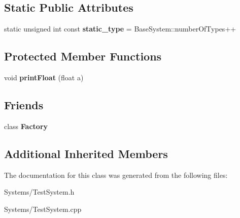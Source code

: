 \subsection*{Static Public Attributes}
\begin{DoxyCompactItemize}
\item 
\mbox{\label{classTestSystem_a2557cacb59b1a2192396bf39bf191df5}} 
static unsigned int const {\bfseries static\+\_\+type} = Base\+System\+::number\+Of\+Types++
\end{DoxyCompactItemize}
\subsection*{Protected Member Functions}
\begin{DoxyCompactItemize}
\item 
\mbox{\label{classTestSystem_a7e9753ae789d2e9a57e428b1c34a7075}} 
void {\bfseries print\+Float} (float a)
\end{DoxyCompactItemize}
\subsection*{Friends}
\begin{DoxyCompactItemize}
\item 
\mbox{\label{classTestSystem_a328c093d609680cca505905c6d49901a}} 
class {\bfseries Factory}
\end{DoxyCompactItemize}
\subsection*{Additional Inherited Members}


The documentation for this class was generated from the following files\+:\begin{DoxyCompactItemize}
\item 
Systems/Test\+System.\+h\item 
Systems/Test\+System.\+cpp\end{DoxyCompactItemize}
